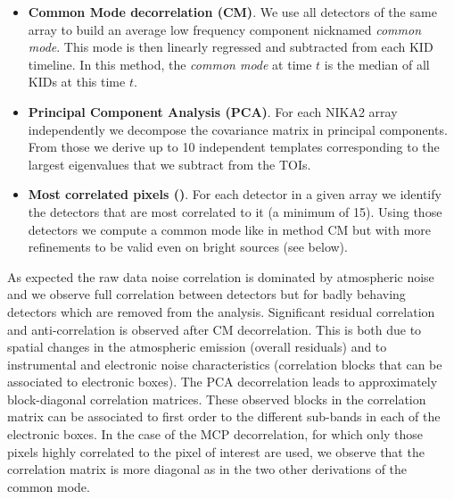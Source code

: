 \begin{itemize}
\item {\bf Common Mode decorrelation (CM)}. We use all detectors of the same
  array to build an average low frequency component nicknamed \emph{common
    mode}. This mode is then linearly regressed and subtracted from each KID
  timeline. In this method, the \emph{common mode} at time $t$ is the median of
  all KIDs at this time $t$.

\item {\bf Principal Component Analysis (PCA)}. For each NIKA2 array
  independently we decompose the covariance matrix in principal components. From
  those we derive up to 10 independent templates corresponding to the largest
  eigenvalues that we subtract from the TOIs.

\item {\bf Most correlated pixels (\cmoneb)}. For each detector in a given array we
  identify the detectors that are most correlated to it (a minimum of
  15). Using those detectors we compute a common mode like in method CM but with
  more refinements to be valid even on bright sources (see below).
\end{itemize}

As expected the raw data
noise correlation is dominated by atmospheric noise and we observe full
correlation between detectors but for badly behaving detectors which are removed
from the analysis. Significant residual correlation and anti-correlation is
observed after CM decorrelation. This is both due to spatial changes in the
atmospheric emission (overall residuals) and to instrumental and electronic
noise characteristics (correlation blocks that can be associated to electronic
boxes).  The PCA decorrelation leads to approximately block-diagonal correlation
matrices. These observed blocks in the correlation matrix can be associated to
first order to the different sub-bands in each of the electronic boxes. In the
case of the MCP decorrelation, for which only those pixels highly correlated to
the pixel of interest are used, we observe that the correlation matrix is more
diagonal as in the two other derivations of the common mode.

